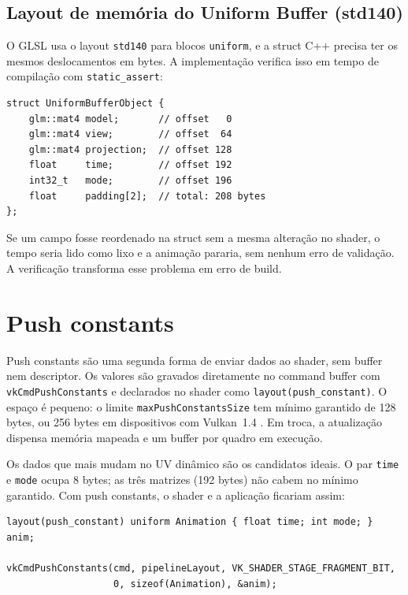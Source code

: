 \subsection{Layout de memória do Uniform Buffer (std140)}

O GLSL usa o layout \texttt{std140} para blocos \texttt{uniform}, e a struct C++ precisa ter os mesmos deslocamentos em bytes. A implementação verifica isso em tempo de compilação com \texttt{static\_assert}:

\begin{verbatim}
struct UniformBufferObject {
    glm::mat4 model;       // offset   0
    glm::mat4 view;        // offset  64
    glm::mat4 projection;  // offset 128
    float     time;        // offset 192
    int32_t   mode;        // offset 196
    float     padding[2];  // total: 208 bytes
};
\end{verbatim}

Se um campo fosse reordenado na struct sem a mesma alteração no shader, o tempo seria lido como lixo e a animação pararia, sem nenhum erro de validação. A verificação transforma esse problema em erro de build.

\section{Push constants}

Push constants são uma segunda forma de enviar dados ao shader, sem buffer nem descriptor. Os valores são gravados diretamente no command buffer com \texttt{vkCmdPushConstants} \cite{vkpushconstants} e declarados no shader como \texttt{layout(push\_constant)}. O espaço é pequeno: o limite \texttt{maxPushConstantsSize} tem mínimo garantido de 128 bytes, ou 256 bytes em dispositivos com Vulkan~1.4 \cite{vkmapping,vklimits}. Em troca, a atualização dispensa memória mapeada e um buffer por quadro em execução.

Os dados que mais mudam no UV dinâmico são os candidatos ideais. O par \texttt{time} e \texttt{mode} ocupa 8 bytes; as três matrizes (192 bytes) não cabem no mínimo garantido. Com push constants, o shader e a aplicação ficariam assim:

\begin{verbatim}
layout(push_constant) uniform Animation { float time; int mode; } anim;

vkCmdPushConstants(cmd, pipelineLayout, VK_SHADER_STAGE_FRAGMENT_BIT,
                   0, sizeof(Animation), &anim);
\end{verbatim}

